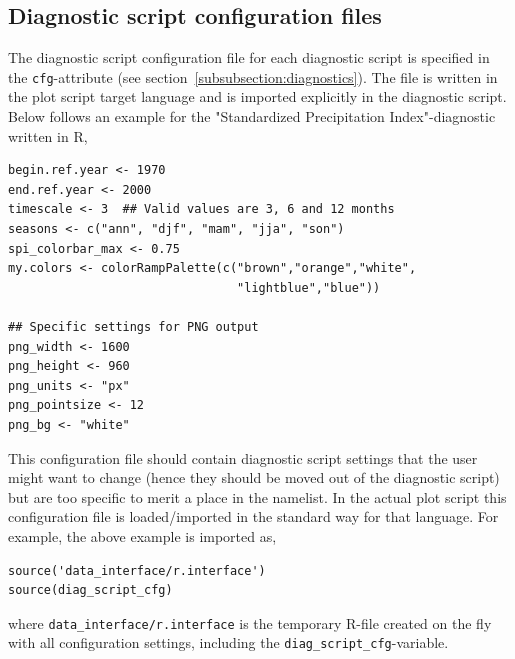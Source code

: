 \documentclass[12pt]{article}
\begin{document}

\subsection{Diagnostic script configuration files}\label{subsection:diagscript-conf-file}
The diagnostic script configuration file for each diagnostic script is
specified in the \texttt{cfg}-attribute (see
section~\ref{subsubsection:diagnostics}). The file is written in the
plot script target language and is imported explicitly in the
diagnostic script. Below follows an example for the "Standardized
Precipitation Index"-diagnostic written in R, 
\begin{Verbatim}[frame=single, fontsize=\footnotesize]
begin.ref.year <- 1970
end.ref.year <- 2000
timescale <- 3  ## Valid values are 3, 6 and 12 months
seasons <- c("ann", "djf", "mam", "jja", "son")
spi_colorbar_max <- 0.75
my.colors <- colorRampPalette(c("brown","orange","white",
                                "lightblue","blue"))

## Specific settings for PNG output
png_width <- 1600
png_height <- 960
png_units <- "px"
png_pointsize <- 12
png_bg <- "white"
\end{Verbatim}
This configuration file should contain diagnostic script settings that
the user might want to change (hence they should be moved out of the
diagnostic script) but are too specific to merit a place in the
namelist. In the actual plot script this configuration file is
loaded/imported in the standard way for that language. For example,
the above example is imported as, 
\begin{Verbatim}[frame=single, fontsize=\footnotesize]
source('data_interface/r.interface')
source(diag_script_cfg)      
\end{Verbatim}
where \texttt{data\_interface/r.interface} is the temporary R-file
created on the fly with all configuration settings, including the
\texttt{diag\_script\_cfg}-variable.

\end{document}
